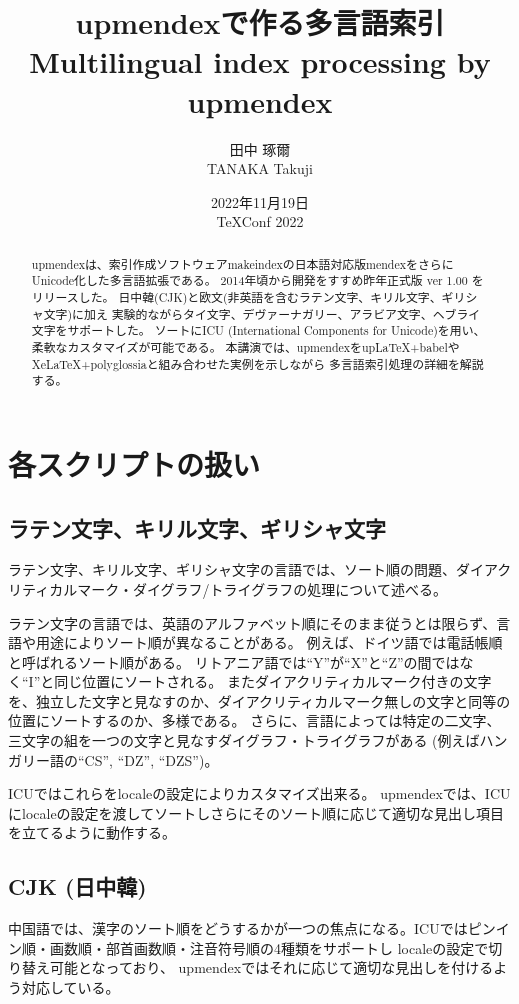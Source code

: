 \documentclass[a4paper]{article}
\title{\textjapanese{upmendexで作る多言語索引}\\
{\normalsize Multilingual index processing by upmendex}}
\author{田中 琢爾\\{\normalsize TANAKA Takuji}}
\date{2022年11月19日\\{\normalsize TeXConf 2022}}
\begin{document}
\maketitle

\begin{abstract}
upmendexは、索引作成ソフトウェアmakeindexの日本語対応版mendexをさらにUnicode化した多言語拡張である。
2014年頃から開発をすすめ昨年正式版 ver 1.00 をリリースした。
日中韓(CJK)と欧文(非英語を含むラテン文字、キリル文字、ギリシャ文字)に加え
実験的ながらタイ文字、デヴァーナガリー、アラビア文字、ヘブライ文字をサポートした。
ソートにICU (International Components for Unicode)を用い、柔軟なカスタマイズが可能である。
本講演では、upmendexをupLaTeX+babelやXeLaTeX+polyglossiaと組み合わせた実例を示しながら
多言語索引処理の詳細を解説する。
\end{abstract}

\section*{各スクリプトの扱い}
\subsection*{ラテン文字、キリル文字、ギリシャ文字}
ラテン文字、キリル文字、ギリシャ文字の言語では、ソート順の問題、ダイアクリティカルマーク・ダイグラフ/トライグラフの処理について述べる。

ラテン文字の言語では、英語のアルファベット順にそのまま従うとは限らず、言語や用途によりソート順が異なることがある。
例えば、ドイツ語では電話帳順と呼ばれるソート順がある。
リトアニア語では``Y''が``X''と``Z''の間ではなく``I''と同じ位置にソートされる。
またダイアクリティカルマーク付きの文字を、独立した文字と見なすのか、ダイアクリティカルマーク無しの文字と同等の位置にソートするのか、多様である。
さらに、言語によっては特定の二文字、三文字の組を一つの文字と見なすダイグラフ・トライグラフがある%
(例えばハンガリー語の``CS'', ``DZ'', ``DZS'')。

ICUではこれらをlocaleの設定によりカスタマイズ出来る。
upmendexでは、ICUにlocaleの設定を渡してソートしさらにそのソート順に応じて適切な見出し項目を立てるように動作する。

\subsection*{CJK (日中韓)}
中国語では、漢字のソート順をどうするかが一つの焦点になる。ICUではピンイン順・画数順・部首画数順・注音符号順の4種類をサポートし
localeの設定で切り替え可能となっており、
upmendexではそれに応じて適切な見出しを付けるよう対応している。
\end{document}
